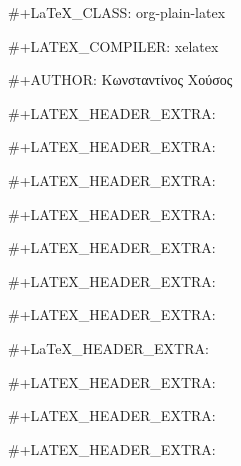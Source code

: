 #+LaTeX_CLASS: org-plain-latex

#+LATEX_COMPILER: xelatex

#+AUTHOR: Κωνσταντίνος Χούσος

#+LATEX_HEADER_EXTRA: \usepackage{amsmath}
#+LATEX_HEADER_EXTRA: \usepackage{amsthm}
#+LATEX_HEADER_EXTRA: \usepackage{amssymb}
#+LATEX_HEADER_EXTRA: \usepackage{xltxtra}
#+LATEX_HEADER_EXTRA: \usepackage{xgreek}
#+LATEX_HEADER_EXTRA: \usepackage{microtype}

#+LATEX_HEADER_EXTRA: \usepackage{minted}
#+LaTeX_HEADER_EXTRA: 


#+LATEX_HEADER_EXTRA: \renewcommand{\baselinestretch}{1.15}


#+LATEX_HEADER_EXTRA: \usepackage[colorlinks]{hyperref}
#+LATEX_HEADER_EXTRA: \hypersetup{colorlinks, linkcolor=blue, urlcolor=blue}






